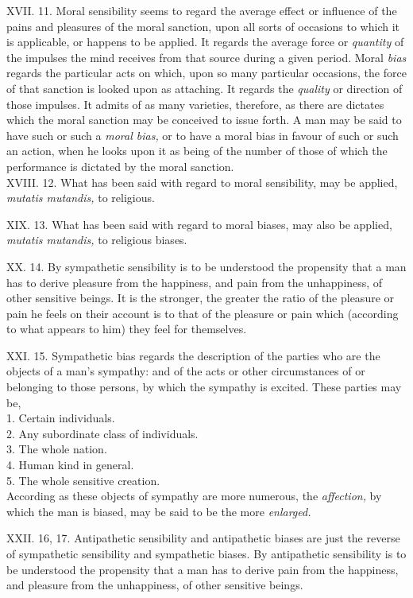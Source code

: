 \documentclass[12pt]{report}
\begin{document}
XVII. 11. Moral sensibility seems to regard the average effect or
influence of the pains and pleasures of the moral sanction, upon all
sorts of occasions to which it is applicable, or happens to be applied.
It regards the average force or \emph{quantity} of the impulses the mind
receives from that source during a given period. Moral \emph{bias}
regards the particular acts on which, upon so many particular occasions,
the force of that sanction is looked upon as attaching. It regards the
\emph{quality} or direction of those impulses. It admits of as many
varieties, therefore, as there are dictates which the moral sanction may
be conceived to issue forth. A man may be said to have such or such a
\emph{moral bias,} or to have a moral bias in favour of such or such an
action, when he looks upon it as being of the number of those of which
the performance is dictated by the moral sanction.\\
XVIII. 12. What has been said with regard to moral sensibility, may be
applied, \emph{mutatis mutandis,} to religious.

XIX. 13. What has been said with regard to moral biases, may also be
applied, \emph{mutatis mutandis,} to religious biases.

XX. 14. By sympathetic sensibility is to be understood the propensity
that a man has to derive pleasure from the happiness, and pain from the
unhappiness, of other sensitive beings. It is the stronger, the greater
the ratio of the pleasure or pain he feels on their account is to that
of the pleasure or pain which (according to what appears to him) they
feel for themselves.

XXI. 15. Sympathetic bias regards the description of the parties who are
the objects of a man's sympathy: and of the acts or other circumstances
of or belonging to those persons, by which the sympathy is excited.
These parties may be,\\
1. Certain individuals.\\
2. Any subordinate class of individuals.\\
3. The whole nation.\\
4. Human kind in general.\\
5. The whole sensitive creation.\\
According as these objects of sympathy are more numerous, the
\emph{affection,} by which the man is biased, may be said to be the more
\emph{enlarged.} \emph{}

XXII. 16, 17. Antipathetic sensibility and antipathetic biases are just
the reverse of sympathetic sensibility and sympathetic biases. By
antipathetic sensibility is to be understood the propensity that a man
has to derive pain from the happiness, and pleasure from the
unhappiness, of other sensitive beings.
\end{document}
